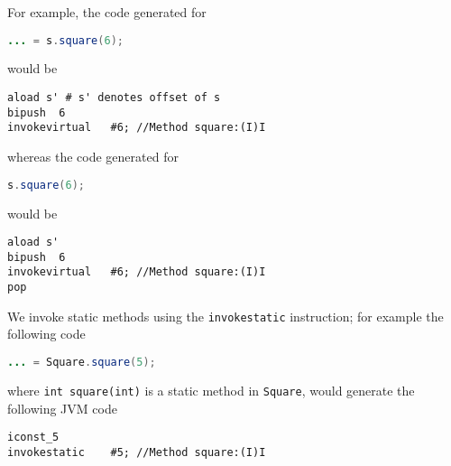 \documentclass[8pt,a4paper,compress]{beamer}
\begin{document}
\begin{frame}[fragile]
\pause

For example, the code generated for 

\smallskip

\begin{lstlisting}[language=Java,style=focusin]
... = s.square(6);
\end{lstlisting}

\smallskip

would be

\smallskip

\begin{lstlisting}[language={},style=focusin]
aload s' # s' denotes offset of s
bipush  6
invokevirtual   #6; //Method square:(I)I
\end{lstlisting}

whereas the code generated for 

\smallskip

\begin{lstlisting}[language=Java,style=focusin]
s.square(6);
\end{lstlisting}

\smallskip

would be 

\smallskip

\begin{lstlisting}[language={},style=focusin]
aload s'
bipush  6
invokevirtual   #6; //Method square:(I)I
pop
\end{lstlisting}

\pause
\bigskip

We invoke static methods using the \lstinline{invokestatic} instruction; for example the following \jmm code

\smallskip

\begin{lstlisting}[language=Java,style=focusin]
... = Square.square(5);
\end{lstlisting}

\smallskip

where \lstinline{int square(int)} is a static method in \lstinline{Square}, would generate the following JVM code

\smallskip

\begin{lstlisting}[language={},style=focusin]
iconst_5
invokestatic    #5; //Method square:(I)I
\end{lstlisting}
\end{frame}
\end{document}
